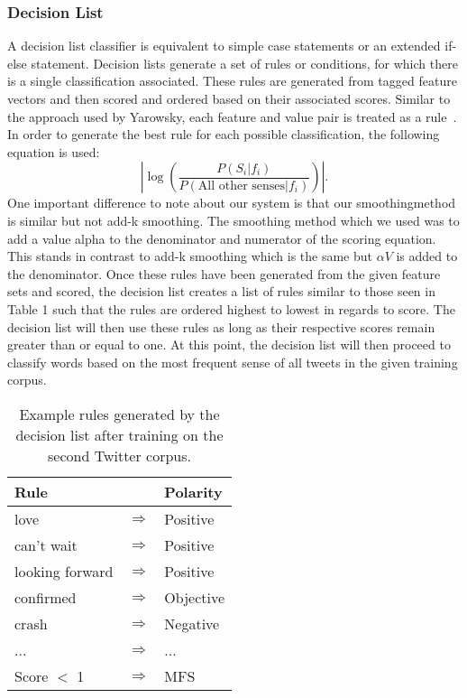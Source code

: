 \documentclass[11pt]{article}
\begin{document}
\subsubsection*{Decision List}
A decision list classifier is equivalent to simple case statements or an extended if-else statement. Decision lists generate a set of rules or conditions, for which there is a single classification associated. These rules are generated from tagged feature vectors and then scored and ordered based on their associated scores. Similar to the approach used by Yarowsky, each feature and value pair is treated as a rule~\cite{yarowsky1994decision}. In order to generate the best rule for each possible classification, the following equation is used:
\[\left|\log\left({\frac{P(S_i|f_i)}{P(\text{All other senses}|f_i)}}\right)\right|.\]
\indent One important difference to note about our system is that our smoothingmethod is similar but not add-k smoothing. The smoothing method which we used was to add a value alpha to the denominator and numerator of the scoring equation. This stands in contrast to add-k smoothing which is the same but $\alpha V$ is added to the denominator. Once these rules have been generated from the given feature sets and scored, the decision list creates a list of rules similar to those seen in Table 1 such that the rules are ordered highest to lowest in regards to score. The decision list will then use these rules as long as their respective scores remain greater than or equal to one. At this point, the decision list will then proceed to classify words based on the most frequent sense of all tweets in the given training corpus.

\begin{table}[H]
  \begin{center}
  \begin{tabular}{| p{3cm} l l |}
  \hline
  Rule & & Polarity \\ \hline
  love & $\Rightarrow$ & Positive \\
  can't wait & $\Rightarrow$ & Positive \\
  looking forward & $\Rightarrow$ & Positive \\
  confirmed & $\Rightarrow$ & Objective \\
  crash & $\Rightarrow$ & Negative \\
  ... & $\Rightarrow$ & ... \\
  Score $<$ 1 & $\Rightarrow$ & MFS \\ \hline
  \end{tabular}
  \end{center}
  \caption{Example rules generated by the decision list after training on the second Twitter corpus.}
\end{table}
\end{document}

